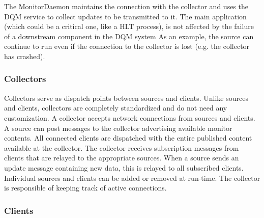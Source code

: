 \documentclass[a4paper]{cmspaper}
\begin{document}
The MonitorDaemon maintains the connection with the collector and uses
the DQM service to collect updates to be transmitted to it.
The main application (which could be a critical one, like a HLT process),
is not affected by the failure of a downstream component in the DQM system
As an example, the source can continue to run even if the connection to the
collector is lost (e.g. the collector has crashed).



\subsubsection{Collectors}
\label{sec:req_collectors}

Collectors serve as dispatch points between sources and clients.
Unlike sources and clients, collectors are completely standardized and do not
need any customization.
A collector accepts network connections from sources and clients. A source
can post messages to the collector advertising available monitor contents.
All connected clients are dispatched with the entire published content available
at the collector. The collector receives subscription messages from clients
that are relayed to the appropriate sources. When a source sends an update message
containing new data, this is relayed to all subscribed clients.
Individual sources and clients can be added or removed at run-time. The collector
is responsible of keeping track of active connections.


%
%
\subsubsection{Clients}
\label{sec:req_clients}
\end{document}
